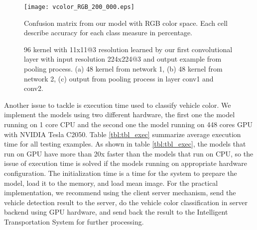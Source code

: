 \documentclass[conference]{IEEEtran}
\begin{document}
\begin{figure}
	\centering	
	\texttt{[image: vcolor\_RGB\_200\_000.eps]}
	\caption{Confusion matrix from our model with RGB color space. Each cell describe accuracy for each class measure in percentage. }
	\label{fig:confmat}
\end{figure}

\begin{figure*}
	\centerline{
	\hfil
	\hfil
	}
	\caption{96 kernel with 11x11@3 resolution learned by our first convolutional layer with input resolution 224x224@3 and output example from pooling process. (a) 48 kernel from network 1, (b) 48 kernel from network 2, (c) output from pooling process in layer conv1 and conv2.}
	\label{fig:first_conv}
\end{figure*}

Another issue to tackle is execution time used to classify vehicle color. We implement the models using two different hardware, the first one the model running on 1 core CPU and the second one the model running on 448 cores GPU with NVIDIA Tesla C2050. Table \ref{tbl:tbl_exec} summarize average execution time for all testing examples. As shown in table \ref{tbl:tbl_exec}, the models that run on GPU have more than 20x faster than the models that run on CPU, so the issue of execution time is solved if the models running on appropriate hardware configuration. The initialization time is a time for the system to prepare the model, load it to the memory, and load mean image. For the practical implementation, we recommend using the client server mechanism, send the vehicle detection result to the server, do the vehicle color classification in server backend using GPU hardware, and send back the result to the Intelligent Transportation System for further processing.
\end{document}
